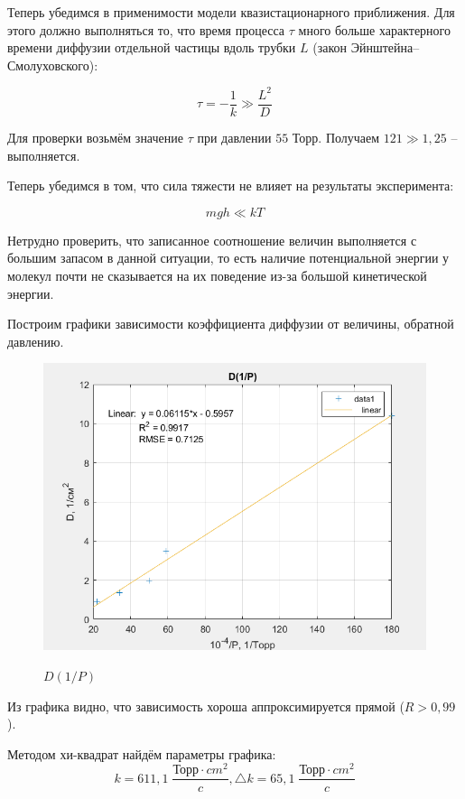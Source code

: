 \documentclass[a4paper, 12pt]{article} %
\begin{document}
Теперь убедимся в применимости модели квазистационарного приближения. Для этого должно выполняться то, что время процесса $\tau$ много больше характерного времени диффузии отдельной частицы вдоль трубки $L$ (закон Эйнштейна–Смолуховского):

\begin{equation}
    \tau = -\frac{1}{k} \gg \frac{L^2}{D}
\end{equation}

Для проверки возьмём значение $\tau$ при давлении $55$ Торр. Получаем $121 \gg 1,25$ -- выполняется. 

Теперь убедимся в том, что сила тяжести не влияет на результаты эксперимента:

\begin{equation}
    mgh \ll kT
\end{equation}

Нетрудно проверить, что записанное соотношение величин выполняется с большим запасом в данной ситуации, то есть наличие потенциальной энергии у молекул почти не сказывается на их поведение из-за большой кинетической энергии.

Построим графики зависимости коэффициента диффузии от величины, обратной давлению.

\begin{figure}[h]
    \centering
    \includegraphics[width = 10.5 cm]{res}
    \label{fig:vac}
    
    \begin{center}
        \caption{$D(1/P)$}
    \end{center}
\end{figure} 

Из графика видно, что зависимость хороша аппроксимируется прямой ($R > 0,99$). 

Методом хи-квадрат найдём параметры графика:
\begin{equation}
    k = 611,1 \; \frac{\text{Торр} \cdot cm^2}{c}, \triangle k = 65,1 \; \frac{\text{Торр} \cdot cm^2}{c} 
\end{equation}
\end{document}
